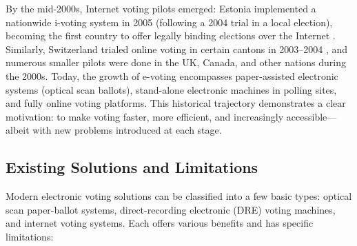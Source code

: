 \documentclass[a4paper,10pt]{report}
\begin{document}
 By the mid-2000s, Internet voting pilots emerged: Estonia implemented a nationwide i-voting system in 2005 (following a 2004 trial in a local election), becoming the first country to offer legally binding elections over the Internet \cite{aceproject}.  Similarly, Switzerland trialed online voting in certain cantons in 2003–2004 \cite{aceproject}, and numerous smaller pilots were done in the UK, Canada, and other nations during the 2000s.  Today, the growth of e-voting encompasses paper-assisted electronic systems (optical scan ballots), stand-alone electronic machines in polling sites, and fully online voting platforms.  This historical trajectory demonstrates a clear motivation: to make voting faster, more efficient, and increasingly accessible—albeit with new problems introduced at each stage.

\subsection{Existing Solutions and Limitations}

Modern electronic voting solutions can be classified into a few basic types: optical scan paper-ballot systems, direct-recording electronic (DRE) voting machines, and internet voting systems.   Each offers various benefits and has specific limitations:
\end{document}
